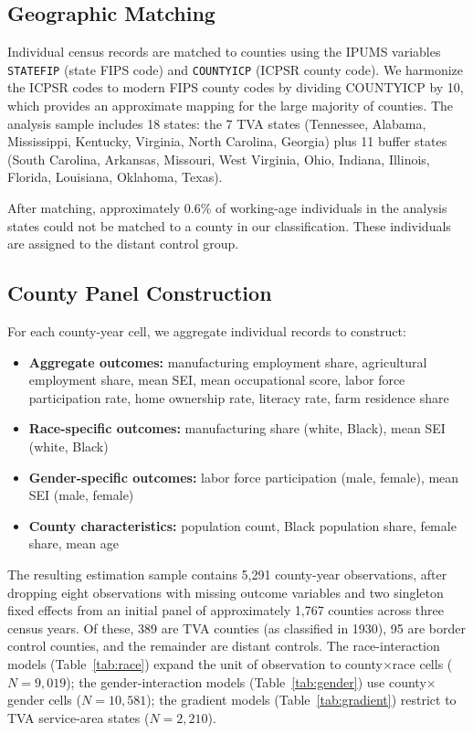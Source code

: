 \documentclass[12pt]{article}
\begin{document}
\subsection{Geographic Matching}

Individual census records are matched to counties using the IPUMS variables \texttt{STATEFIP} (state FIPS code) and \texttt{COUNTYICP} (ICPSR county code). We harmonize the ICPSR codes to modern FIPS county codes by dividing COUNTYICP by 10, which provides an approximate mapping for the large majority of counties. The analysis sample includes 18 states: the 7 TVA states (Tennessee, Alabama, Mississippi, Kentucky, Virginia, North Carolina, Georgia) plus 11 buffer states (South Carolina, Arkansas, Missouri, West Virginia, Ohio, Indiana, Illinois, Florida, Louisiana, Oklahoma, Texas).

After matching, approximately 0.6\% of working-age individuals in the analysis states could not be matched to a county in our classification. These individuals are assigned to the distant control group.

\subsection{County Panel Construction}

For each county-year cell, we aggregate individual records to construct:
\begin{itemize}
\item \textbf{Aggregate outcomes:} manufacturing employment share, agricultural employment share, mean SEI, mean occupational score, labor force participation rate, home ownership rate, literacy rate, farm residence share
\item \textbf{Race-specific outcomes:} manufacturing share (white, Black), mean SEI (white, Black)
\item \textbf{Gender-specific outcomes:} labor force participation (male, female), mean SEI (male, female)
\item \textbf{County characteristics:} population count, Black population share, female share, mean age
\end{itemize}

The resulting estimation sample contains 5,291 county-year observations, after dropping eight observations with missing outcome variables and two singleton fixed effects from an initial panel of approximately 1,767 counties across three census years. Of these, 389 are TVA counties (as classified in 1930), 95 are border control counties, and the remainder are distant controls. The race-interaction models (Table~\ref{tab:race}) expand the unit of observation to county$\times$race cells ($N = 9{,}019$); the gender-interaction models (Table~\ref{tab:gender}) use county$\times$gender cells ($N = 10{,}581$); the gradient models (Table~\ref{tab:gradient}) restrict to TVA service-area states ($N = 2{,}210$).
\end{document}
